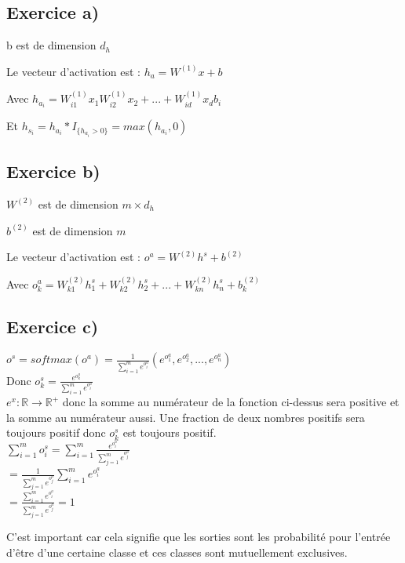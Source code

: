 \documentclass[a4paper,10pt]{article}
\begin{document}
\subsection{Exercice a)}

b est de dimension $d_{h}$

Le vecteur d'activation est : $h_{a} = W^{(1)}x +b$

Avec $ h_{a_i} = W^{(1)}_{i1} x_{1}  W^{(1)}_{i2} x_{2} + ... + W^{(1)}_{id} x_{d} b_{i}$

Et $h_{s_i} = h_{a_i}*I_{ \{ h_{a_i} > 0 \} } = max(h_{a_i}, 0)$

\subsection{Exercice b)}

$W^{(2)}$ est de dimension $m \times d_{h}$

$b^{(2)}$ est de dimension $m$

Le vecteur d'activation est : $o^{a} = W^{(2)} h^{s} + b^{(2)}$

Avec $o^{a}_{k} = W^{(2)}_{k1} h^s_1 + W^{(2)}_{k2} h^s_2 + ... + W^{(2)}_{kn} h^s_n + b^{(2)}_{k}$

\subsection{Exercice c)}

$o^{s} = softmax(o^{a}) = \frac{1}{\sum_{i=1}^{m} e^{o^{a}_{i}}}  (e^{o^{a}_{1}}, e^{o^{a}_{2}}, ..., e^{o^{a}_{n}})$
\\[6pt]
Donc $o^{s}_{k} = \frac{e^{o^{a}_{k}}}{\sum_{i=1}^{m} e^{o^{a}_{i}}}$
\\[6pt]
$e^{x} : \mathds{R} \rightarrow \mathds{R}^{+}$ donc la somme au numérateur de la fonction ci-dessus sera positive et la somme au numérateur aussi. Une fraction de deux nombres positifs sera toujours positif donc $o^{s}_{k}$ est toujours positif.
\\[6pt]
$\sum^{m}_{i=1} o^{s}_{i} = \sum^{m}_{i=1} \frac{e^{o^{a}_{i}}}{\sum_{j=1}^{m} e^{o^{a}_{j}}}$
\\[6pt]
$ = \frac{1}{\sum_{j=1}^{m} e^{o^{a}_{j}}} \sum^{m}_{i=1} e^{o^{a}_{i}}$
\\[6pt]
$ = \frac{\sum^{m}_{i=1} e^{o^{a}_{i}}}{\sum_{j=1}^{m} e^{o^{a}_{j}}}=1$


C'est important car cela signifie que les sorties sont les probabilité pour l'entrée d'être d'une certaine classe et ces classes sont mutuellement exclusives.
\end{document}
